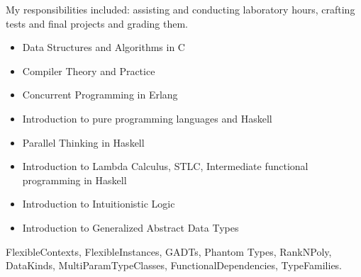     My responsibilities included: assisting and conducting laboratory
    hours, crafting tests and final projects and grading them.
    \begin{itemize}
        \item {Data Structures and Algorithms in C}
        \item {Compiler Theory and Practice}
        \item {Concurrent Programming in Erlang}
        \item {Introduction to pure programming languages and Haskell}
        \item {Parallel Thinking in Haskell}
        \item {Introduction to Lambda Calculus, STLC, Intermediate functional programming in Haskell}
        \item {Introduction to Intuitionistic Logic}
        \item {Introduction to Generalized Abstract Data Types}
    \end{itemize}


    \divider


    \divider


    \divider

    {FlexibleContexts, FlexibleInstances, GADTs, Phantom Types,
    RankNPoly, DataKinds, MultiParamTypeClasses, FunctionalDependencies,
    TypeFamilies.}

    \divider


